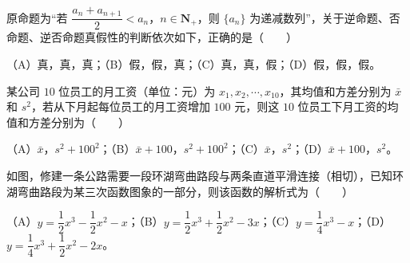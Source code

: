 \begin{question}
原命题为“若 $\dfrac{a_n+a_{n+1}}2<a_n$，$n\in\mathbf N_+$，则 $\{a_n\}$ 为递减数列”，关于逆命题、否命题、逆否命题真假性的判断依次如下，正确的是\mbox{（　　）}

（A）真，真，真；（B）假，假，真；（C）真，真，假；（D）假，假，假。

\end{question}
\begin{question}
某公司 $10$ 位员工的月工资（单位：元）为 $x_1,x_2,\cdots,x_{10}$，其均值和方差分别为 $\bar x$ 和 $s^2$，若从下月起每位员工的月工资增加 $100$ 元，则这 $10$ 位员工下月工资的均值和方差分别为\mbox{（　　）}

（A）$\bar x$，$s^2+100^2$；（B）$\bar x+100$，$s^2+100^2$；（C）$\bar x$，$s^2$；（D）$\bar x+100$，$s^2$。

\Needspace{0.4\textheight}
\end{question}
\begin{question}
如图，修建一条公路需要一段环湖弯曲路段与两条直道平滑连接（相切），已知环湖弯曲路段为某三次函数图象的一部分，则该函数的解析式为\mbox{（　　）}
\nopagebreak[4]
\begin{center}\end{center}
\nopagebreak[4]
（A）$y=\dfrac12x^3-\dfrac12x^2-x$；（B）$y=\dfrac12x^3+\dfrac12x^2-3x$；（C）$y=\dfrac14x^3-x$；（D）$y=\dfrac14x^3+\dfrac12x^2-2x$。

\end{question}

